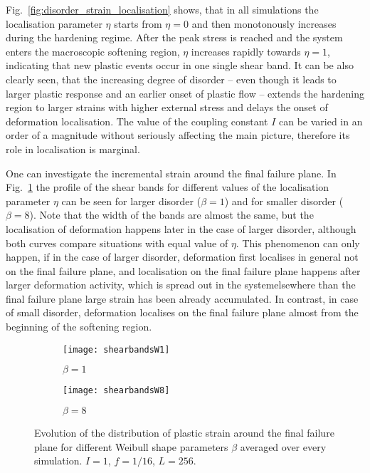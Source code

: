 Fig.~\ref{fig:disorder_strain_localisation} shows, that in all simulations the localisation parameter $\eta$ starts from $\eta=0$ and then monotonously increases during the hardening regime. After the peak stress is reached and the system enters the macroscopic softening region, $\eta$ increases rapidly towards $\eta=1$, indicating that new plastic events occur in one single shear band. It can be also clearly seen, that the increasing degree of disorder -- even though it leads to larger plastic response and an earlier onset of plastic flow -- extends the hardening region to larger strains with higher external stress and delays the onset of deformation localisation. The value of the coupling constant $I$ can be varied in an order of a magnitude without seriously affecting the main picture, therefore its role in localisation is marginal.

One can investigate the incremental strain around the final failure plane. In Fig.~\ref{fig:disorder_shear_band_evol} the profile of the shear bands for different values of the localisation parameter $\eta$ can be seen for larger disorder ($\beta=1$) and for smaller disorder ($\beta=8$). Note that the width of the bands are almost the same, but the localisation of deformation happens later in the case of larger disorder, although both curves compare situations with equal value of $\eta$. This phenomenon can only happen, if in the case of larger disorder, deformation first localises in general not on the final failure plane, and localisation on the final failure plane happens after larger deformation activity, which is spread out in the systemelsewhere than the final failure plane large strain has been already accumulated. In contrast, in case of small disorder, deformation localises on the final failure plane almost from the beginning of the softening region.

\begin{figure}[htbp] 
\centering
\begin{subfigure}[b]{0.45\textwidth}
\texttt{[image: shearbandsW1]}
\caption{$\beta=1$}
\end{subfigure}
\begin{subfigure}[b]{0.45\textwidth}
\texttt{[image: shearbandsW8]}
\caption{$\beta=8$}
\end{subfigure}
\caption[Evolution of deformation band]{Evolution of the distribution of plastic strain around the final failure plane for different Weibull shape parameters $\beta$ averaged over every simulation. $I=1$, $f=1/16$, $L=256$.}
\label{fig:disorder_shear_band_evol}
\end{figure}

